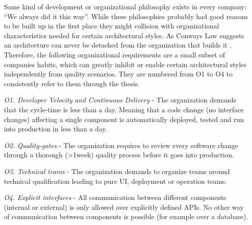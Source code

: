 Some kind of development or organizational philosophy exists in every company: ``We always did it this way''.
While these philosophies probably had good reasons to be built up in the first place they might collision with organizational characteristics needed for certain architectural styles.
As Conways Law suggests an architecture can never be detached from the organization that builds it \citep{Conway1968}.
Therefore, the following organizational requirements are a small subset of companies habits, which can greatly inhibit or enable certain architectural styles independently from quality scenarios.
They are numbered from O1 to O4 to consistently refer to them through the thesis.

\textit{O1. Developer Velocity and Continuous Delivery} - 
The organization demands that the cycle-time is less than a day. Meaning that a code change (no interface changes) affecting a single component is automatically deployed, tested and run into production in less than a day.

\textit{O2. Quality-gates} - 
The organization requires to review every software change through a thorough (>1week) quality process before it goes into production.

\textit{O3. Technical teams} -
The organization demands to organize teams around technical qualification leading to pure \ac{UI}, deployment or operation teams.

\textit{O4. Explicit interfaces} - 
All communication between different components (internal or external) is only allowed over explicitly defined \ac{API}s. No other way of communication between components is possible (for example over a database).

